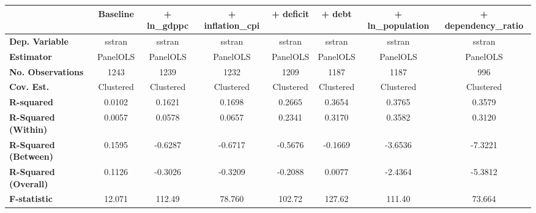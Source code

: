 \begin{center}
\begin{tabular}{lccccccc}
\toprule
                                   & \textbf{Baseline} & \textbf{+ ln\_gdppc} & \textbf{+ inflation\_cpi} & \textbf{+ deficit} & \textbf{+ debt} & \textbf{+ ln\_population} & \textbf{+ dependency\_ratio}  \\
\midrule
\textbf{Dep. Variable}             &       sstran      &        sstran        &           sstran          &       sstran       &      sstran     &           sstran          &            sstran             \\
\textbf{Estimator}                 &      PanelOLS     &       PanelOLS       &          PanelOLS         &      PanelOLS      &     PanelOLS    &          PanelOLS         &           PanelOLS            \\
\textbf{No. Observations}          &        1243       &         1239         &            1232           &        1209        &       1187      &            1187           &             996               \\
\textbf{Cov. Est.}                 &     Clustered     &      Clustered       &         Clustered         &     Clustered      &    Clustered    &         Clustered         &          Clustered            \\
\textbf{R-squared}                 &       0.0102      &        0.1621        &           0.1698          &       0.2665       &      0.3654     &           0.3765          &            0.3579             \\
\textbf{R-Squared (Within)}        &       0.0057      &        0.0578        &           0.0657          &       0.2341       &      0.3170     &           0.3582          &            0.3120             \\
\textbf{R-Squared (Between)}       &       0.1595      &       -0.6287        &          -0.6717          &      -0.5676       &     -0.1669     &          -3.6536          &           -7.3221             \\
\textbf{R-Squared (Overall)}       &       0.1126      &       -0.3026        &          -0.3209          &      -0.2088       &      0.0077     &          -2.4364          &           -5.3812             \\
\textbf{F-statistic}               &       12.071      &        112.49        &           78.760          &       102.72       &      127.62     &           111.40          &            73.664             \\

\end{tabular}
\end{center}
